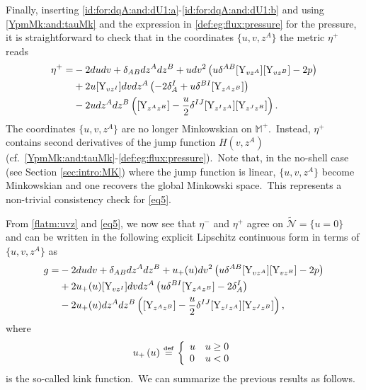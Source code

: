 \documentclass[11pt]{article}
\numberwithin{equation}{section}
\def\Mkp{\mathbb{M}^+}
\def\flatp{\eta^+}
\def\flatm{\eta^-}
\def\defi{{\stackrel{\mbox{\tiny {\textbf{def}}}}{\,\, = \,\, }}}
\def\Y{\textup{Y}}
\newcommand{\nn}{\nonumber}
\newcommand\N{\mathcal N}
\def\defi{{\stackrel{\mbox{\tiny \textup{\textbf{def}}}}{\,\, = \,\, }}}
\def\Y{\textup{Y}}
\newcommand{\lp}{\left(}
\newcommand{\rp}{\right)}
\newcommand{\lb}{\left\lbrace}
\newcommand{\rd}{\right.}
\newcommand{\nullhyp}{\widetilde{\N}}
\begin{document}
Finally, inserting \eqref{id:for:dqA:and:dU1:a}-\eqref{id:for:dqA:and:dU1:b} and using \eqref{YpmMk:and:tauMk} and the expression in \eqref{def:eg:flux:pressure} for the pressure, it is straightforward to check that in the coordinates $\{u,v,z^A\}$ the metric $\flatp$ reads 
\begin{align}
\nonumber \flatp=&-2dudv +\delta_{AB}dz^Adz^B+udv^2\lp u\delta^{AB}[\Y_{vz^A}][\Y_{vz^B}]-2p\rp\\
\nn  &+2u[\Y_{vz^I}]dvdz^A\lp -2\delta^I_A+u\delta^{BI}[\Y_{z^Az^B}]\rp\\
\label{eq5} &-2udz^Adz^B\lp [\Y_{z^Az^B}]-\frac{u}{2}\delta^{IJ}[\Y_{z^Iz^A}][\Y_{z^Jz^B}]\rp.
\end{align}
The coordinates $\{u,v,z^A\}$ are no longer Minkowskian on $\Mkp$.\ Instead, $\flatp$ contains second derivatives of the jump function $H(v,z^A)$ (cf.\  \eqref{YpmMk:and:tauMk}-\eqref{def:eg:flux:pressure}).\ Note that, in the no-shell case (see Section \ref{sec:intro:MK}) where the jump function is linear, $\{u,v,z^A\}$ become Minkowskian and one recovers the global Minkowski space.\ This represents a non-trivial consistency check for \eqref{eq5}.\

From \eqref{flatm:uvz} and \eqref{eq5}, we now see that $\flatm$ and $\flatp$ agree on $\nullhyp=\{u=0\}$ and can be written in the following explicit Lipschitz continuous form in terms of $\{u,v,z^A\}$ 
as 
\begin{align}
\nn g=&-2dudv +\delta_{AB}dz^Adz^B+u_+( u)dv^2\lp u\delta^{AB}[\Y_{vz^A}][\Y_{vz^B}]-2p\rp\\
\nn  &+2u_+( u)[\Y_{vz^I}]dvdz^A\lp u\delta^{BI}[\Y_{z^Az^B}]-2\delta^I_A\rp\\
\label{c0metricprevious:}&-2u_+( u)dz^Adz^B\lp [\Y_{z^Az^B}]-\frac{u}{2}\delta^{IJ}[\Y_{z^Iz^A}][\Y_{z^Jz^B}]\rp,
\end{align}
where $$u_+\lp u\rp\defi\lb\begin{array}{ll}u & u\geq0\\ 0 & u<0\end{array}\rd$$ is the so-called kink function.\ We can summarize the previous results as follows. 
\end{document}

